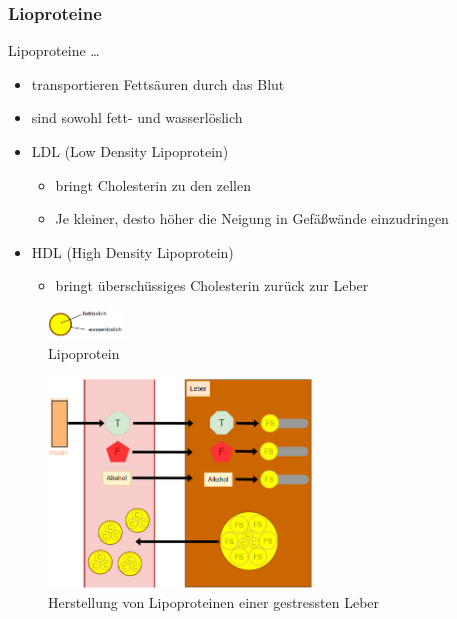 \documentclass[xcolor=dvipsnames]{beamer}
\begin{document}
    \begin{frame}[allowframebreaks]
        \frametitle{Lioproteine}

        \begin{block}{Lipoproteine \ldots}
            \begin{itemize}
                \setlength\itemsep{1em}
                \item transportieren Fettsäuren durch das Blut
                \item sind sowohl fett- und wasserlöslich
                \item LDL (Low Density Lipoprotein)
                \begin{itemize}
                    \item bringt Cholesterin zu den zellen
                    \item Je kleiner, desto höher die Neigung in Gefäßwände einzudringen
                \end{itemize}
                \item HDL (High Density Lipoprotein)
                \begin{itemize}
                    \item bringt überschüssiges Cholesterin zurück zur Leber
                \end{itemize}
            \end{itemize}
        \end{block}

        \begin{figure}
            \centering
            \includegraphics[width=2cm]{../images/lipo.png}
            \caption{Lipoprotein}
        \end{figure}

        \framebreak

        \begin{figure}
            \centering
            \includegraphics[width=7cm]{../images/lipo_1.png}
            \caption{Herstellung von Lipoproteinen einer gestressten Leber}
        \end{figure}

    \end{frame}
\end{document}
